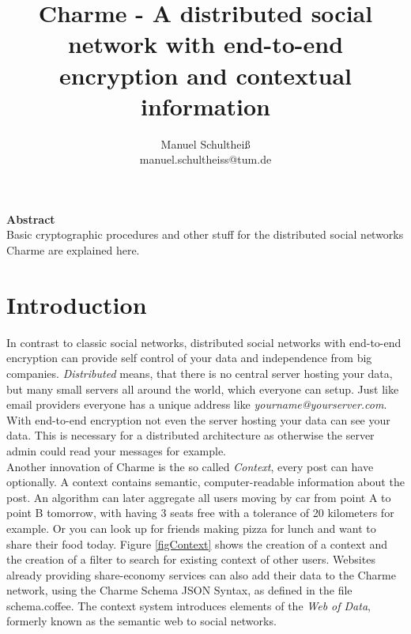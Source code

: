 \documentclass{scrartcl}
\title{Charme - A distributed social network with end-to-end encryption and contextual information}
\author{Manuel Schultheiß\\manuel.schultheiss@tum.de}
\begin{document}
  \sloppy %
 
\maketitle
\textbf{Abstract}\\
Basic cryptographic procedures and other stuff for the distributed social networks Charme are explained here.

\tableofcontents
 \newpage



\section{Introduction}
In contrast to classic social networks, distributed social networks with end-to-end encryption can provide self control of your data and  independence from big companies.  \textit{Distributed} means, that there is no central server hosting your data, but many small servers all around the world, which everyone can  setup. Just like email providers everyone has a unique address like \textit{yourname@yourserver.com}. With end-to-end encryption not even the server hosting your data can see your data. This is necessary for a distributed architecture as otherwise the server admin could read your messages for example.\\

Another innovation of Charme is the so called \textit{Context}, every post can have optionally. A context contains semantic, computer-readable information about the post.
 An algorithm can later aggregate all users moving by car from point A to point B tomorrow, with having 3 seats free with a tolerance of 20 kilometers for example. Or you can look up for friends making pizza for lunch and want to share their food today. Figure \ref{figContext} shows the creation of a context and the creation of a filter to search for existing context of other users. 
 Websites already providing share-economy services can also add their data to the Charme network, using the Charme Schema JSON Syntax, as defined in the file schema.coffee. The context system introduces elements of the \textit{Web of Data}, formerly known as the semantic web to social networks.
\end{document}
